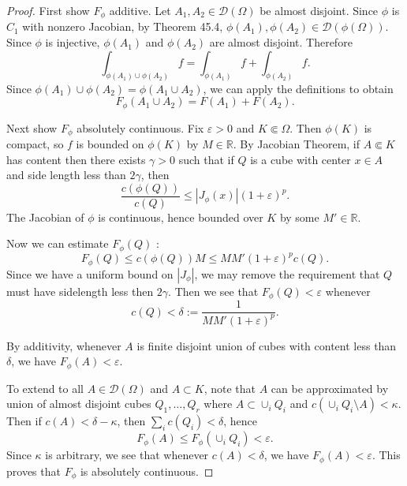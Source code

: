 \begin{proof}
	First show $F_\phi$ additive. Let $A_1, A_2 \in \mathcal{D}(\Omega)$ be almost disjoint. Since $\phi$ is $C_1$ with nonzero Jacobian, by Theorem 45.4,  $\phi(A_1), \phi(A_2) \in \mathcal{D}(\phi(\Omega))$. Since $\phi$ is injective, $\phi(A_1)$ and $\phi(A_2)$ are almost disjoint. Therefore
	\[
		\int _{\phi(A_1) \cup \phi(A_2)} f = \int _{\phi(A_1)}f + \int _{\phi(A_2)}f
	.\] 
	Since $\phi(A_1) \cup \phi(A_2) = \phi(A_1 \cup A_2)$, we can apply the definitions to obtain
	\[
		F_{\phi}(A_1 \cup A_2) = F(A_1) + F(A_2)
	.\] 

	Next show $F_ \phi$ absolutely continuous. 
	Fix $\varepsilon>0$ and $K \Subset \Omega$. Then  $\phi(K)$ is compact, so $f$ is bounded on $\phi(K)$ by $M \in \mathbb{R}$. By Jacobian Theorem, if $A \Subset K$ has content then there exists $\gamma>0$ such that if $Q$ is a cube with center $x \in A$ and side length less than $2 \gamma$, then
	\[
		\frac{c(\phi(Q))}{c(Q)}\le |J_{\phi}(x)| (1 + \varepsilon)^p
	.\] 
	The Jacobian of $\phi$ is continuous, hence bounded over $K$ by some $M' \in \mathbb{R}$. 

	Now we can estimate $F_ \phi(Q)$ :
	\[
		F_ \phi(Q) 
		\le c(\phi(Q)) M
		\le MM' (1+\varepsilon)^p c(Q)
	.\]
	Since we have a uniform bound on $|J_ \phi|$, we may remove the requirement that $Q$ must have sidelength less then $2 \gamma$. Then we see that $F_ \phi(Q) < \varepsilon$ whenever
	\[
		c(Q) < \delta := \frac{1}{M M' (1+\varepsilon)^p}
	.\] 

	By additivity, whenever $A$ is finite disjoint union of cubes with content less than $\delta$, we have $F_ \phi(A) < \varepsilon$.

	To extend to all $A \in \mathcal{D}(\Omega)$ and $A \subset K$, note that $A$ can be approximated by union of almost disjoint cubes $Q_1, \ldots, Q_r$ where $A \subset \cup_i Q_i$ and $c\left( \cup _i Q_i \setminus A \right)  < \kappa$. Then if $c(A) < \delta - \kappa$, then $\sum_{i} c(Q_i)  < \delta$, hence
	\[
		F_ \phi(A) \le F_ \phi (\cup_i Q_i) < \varepsilon
	.\] 
	Since $\kappa$ is arbitrary, we see that whenever $c(A) < \delta$, we have $F_ \phi\left(A \right)  < \varepsilon$. This proves that $F_ \phi$ is absolutely continuous.


\end{proof}
